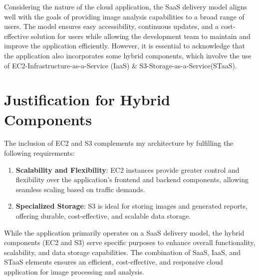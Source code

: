 Considering the nature of the cloud application, the SaaS delivery model aligns well with the goals of providing image analysis capabilities to a broad range of users. The model ensures easy accessibility, continuous updates, and a cost-effective solution for users while allowing the development team to maintain and improve the application efficiently.
\newline
\newline
However, it is essential to acknowledge that the application also incorporates some hybrid components, which involve the use of EC2-Infrastructure-as-a-Service (IaaS) \& S3-Storage-as-a-Service(STaaS).

\section{Justification for Hybrid Components}
The inclusion of EC2 and S3 complements my architecture by fulfilling the following requirements:
\begin{enumerate}
    \item \textbf{Scalability and Flexibility}: EC2 instances provide greater control and flexibility over the application's frontend and backend components, allowing seamless scaling based on traffic demands.
    \item \textbf{Specialized Storage}: S3 is ideal for storing images and generated reports, offering durable, cost-effective, and scalable data storage.
\end{enumerate}

While the application primarily operates on a SaaS delivery model, the hybrid components (EC2 and S3) serve specific purposes to enhance overall functionality, scalability, and data storage capabilities. The combination of SaaS, IaaS, and STaaS elements ensures an efficient, cost-effective, and responsive cloud application for image processing and analysis.
\newpage


